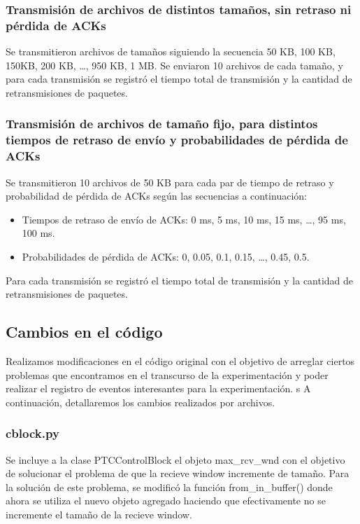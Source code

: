 \documentclass[a4paper, 10pt, twoside]{article}
\begin{document}
\subsubsection{Transmisión de archivos de distintos tamaños, sin retraso ni pérdida de ACKs}

Se transmitieron archivos de tamaños siguiendo la secuencia 50 KB, 100 KB, 150KB, 200 KB, \ldots, 950 KB, 1 MB. Se enviaron 10 archivos de cada tamaño, y para cada transmisión se registró el tiempo total de transmisión y la cantidad de retransmisiones de paquetes.


\subsubsection{Transmisión de archivos de tamaño fijo, para distintos tiempos de retraso de envío y probabilidades de pérdida de ACKs}

Se transmitieron 10 archivos de 50 KB para cada par de tiempo de retraso y probabilidad de pérdida de ACKs según las secuencias a continuación:

\begin{itemize}
  \item Tiempos de retraso de envío de ACKs:  0 ms, 5 ms, 10 ms, 15 ms, \ldots, 95 ms, 100 ms.
  \item Probabilidades de pérdida de ACKs: 0, 0.05, 0.1, 0.15, \ldots, 0.45, 0.5.
\end{itemize}

Para cada transmisión se registró el tiempo total de transmisión y la cantidad de retransmisiones de paquetes.






\subsection{Cambios en el código}
Realizamos modificaciones en el código original con el objetivo de arreglar ciertos problemas que encontramos en el transcurso de la experimentación y poder realizar
el registro de eventos interesantes para la experimentación.
s
A continuación, detallaremos los cambios realizados por archivos.

\subsubsection{cblock.py}
Se incluye a la clase PTCControlBlock el objeto max\_rcv\_wnd con el objetivo de solucionar el problema de que la recieve window incremente de tamaño. Para la solución de este problema, se modificó la función from\_in\_buffer() donde ahora se utiliza el nuevo objeto agregado haciendo que efectivamente no se incremente el tamaño de la recieve window.
\end{document}
